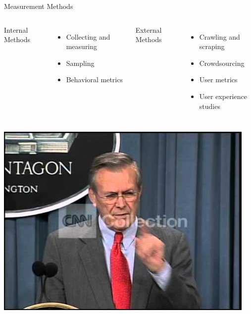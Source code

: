 \documentclass[nobackground,dvipsnames,table]{beamer}
\begin{document}
\begin{frame}{Measurement Methods}
    \begin{columns}[T]
            \Large{Internal Methods} \\
            \begin{itemize}
                \item Collecting and measuring \\
                \item Sampling \\
                \item Behavioral metrics \\
            \end{itemize}
            \Large{External Methods} \\
            \begin{itemize}
                \item Crawling and scraping \\
                \item Crowdsourcing \\
                \item User metrics \\
                \item User experience studies \\
            \end{itemize}
    \end{columns}
\end{frame}

\begin{frame}{} %
    \thispagestyle{empty}
    \href{https://www.youtube.com/watch?v=REWeBzGuzCc}{\includegraphics[width=\paperwidth]{unknown-unknowns}}
\end{frame}
\end{document}
